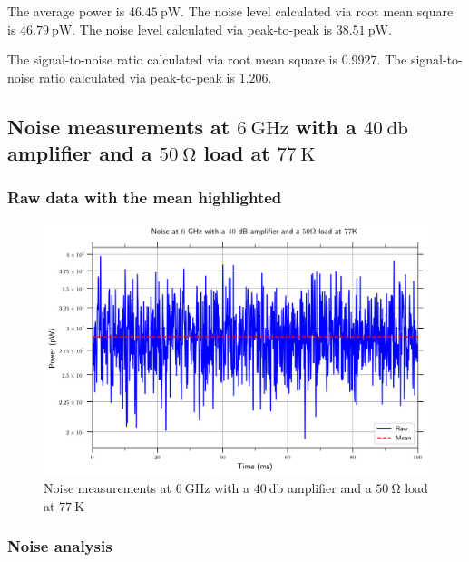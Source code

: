 \documentclass[english,12pt,a4paper]{article}
\begin{document}
	The average power is $\qty{46.45}{\pico\watt}$.
	The noise level calculated via root mean square is $\qty{46.79}{\pico\watt}$.
	The noise level calculated via peak-to-peak is $\qty{38.51}{\pico\watt}$.
	
	The signal-to-noise ratio calculated via root mean square is $0.9927$.
	The signal-to-noise ratio calculated via peak-to-peak is $1.206$.



\subsection{Noise measurements at $\qty{6}{\giga\hertz}$ with a $\qty{40}{\decibel}$ amplifier and a $\qty{50}{\ohm}$ load at $\qty{77}{\kelvin}$}

 

\hypertarget{raw-data-with-the-mean-highlighted}{%
	\subsubsection{Raw data with the mean
		highlighted}\label{raw-data-with-the-mean-highlighted_7}}

\begin{figure}[H]
	\includegraphics[width=1\linewidth]{Plots/noise_floor_6_GHz_amplif_50ohm_lt}
	\caption{Noise measurements at $\qty{6}{\giga\hertz}$ with a $\qty{40}{\decibel}$ amplifier and a $\qty{50}{\ohm}$ load at $\qty{77}{\kelvin}$}
	\label{fig:noisefloor6ghzamplif50ohmlt}
\end{figure}

 

\hypertarget{noise-analysis}{%
	\subsubsection{Noise analysis}\label{noise-analysis_7}}
\end{document}
